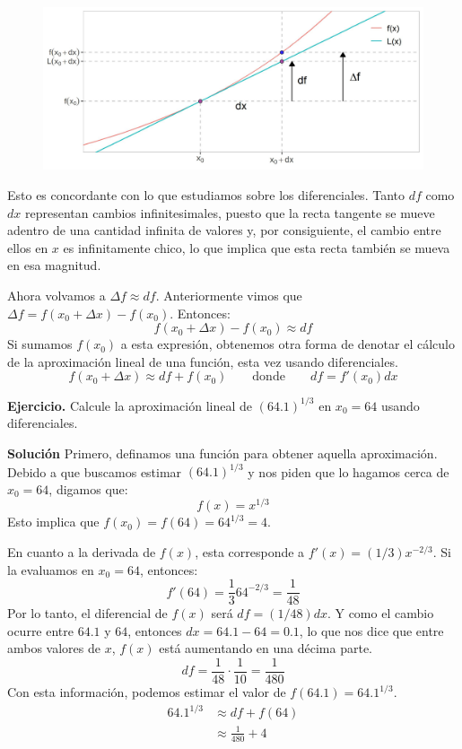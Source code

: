 \documentclass[12pt]{article}
\begin{document}
\begin{figure}[hbt!]
\centering
\includegraphics[scale=0.7]{img/diff_examp_plot_3.jpg}
\end{figure}

Esto es concordante con lo que estudiamos sobre los diferenciales. Tanto $df$ como $dx$ representan cambios infinitesimales, puesto que la recta tangente se mueve adentro de una cantidad infinita de valores y, por consiguiente, el cambio entre ellos en $x$ es infinitamente chico, lo que implica que esta recta también se mueva en esa magnitud.

Ahora volvamos a $\Delta f \approx df$. Anteriormente vimos que $\Delta f = f(x_{0} + \Delta x) - f(x_{0})$. Entonces:
\[
  f(x_{0} + \Delta x) - f(x_{0}) \approx df
\]
Si sumamos $f(x_{0})$ a esta expresión, obtenemos otra forma de denotar el cálculo de la aproximación lineal de una función, esta vez usando diferenciales.
\[
  f(x_{0} + \Delta x) \approx df + f(x_{0}) \qquad \text{donde} \qquad df = f'(x_{0}) dx
\]

\newpage

\textbf{Ejercicio.} \quad Calcule la aproximación lineal de $(64.1)^{1/3}$ en $x_{0} = 64$ usando diferenciales.

\textbf{Solución} \quad Primero, definamos una función para obtener aquella aproximación. Debido a que buscamos estimar $(64.1)^{1/3}$ y nos piden que lo hagamos cerca de $x_{0} = 64$, digamos que:
\[
  f(x) = x^{1/3}
\]
Esto implica que $f(x_{0}) = f(64) = 64^{1/3} = 4$.

En cuanto a la derivada de $f(x)$, esta corresponde a $f'(x) = (1/3) x^{-2/3}$. Si la evaluamos en $x_{0} = 64$, entonces:
\[
  f'(64) = \frac{1}{3} 64^{-2/3} = \frac{1}{48}
\]
Por lo tanto, el diferencial de $f(x)$ será $df = (1/48)dx$. Y como el cambio ocurre entre $64.1$ y $64$, entonces $dx = 64.1 - 64 = 0.1$, lo que nos dice que entre ambos valores de $x$, $f(x)$ está aumentando en una décima parte.
\[
  df = \frac{1}{48} \cdot \frac{1}{10} = \frac{1}{480}
\]
Con esta información, podemos estimar el valor de $f(64.1) = 64.1^{1/3}$.
\begin{align*}
64.1^{1/3} &\approx df + f(64) \\
           &\approx \frac{1}{480} + 4 
\end{align*}
\end{document}
